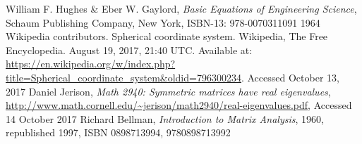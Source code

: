 \documentclass[]{article}
\begin{document}
\begin{thebibliography}{9}\label{section:biblio}
	\raggedright
	William F. Hughes \& Eber W. Gaylord,
	\emph{Basic Equations of Engineering Science},
	Schaum Publishing Company, New York,
	ISBN-13: 978-0070311091
	1964
	Wikipedia contributors. Spherical coordinate system. Wikipedia, The Free Encyclopedia. August 19, 2017, 21:40 UTC. Available at: 
	\url{https://en.wikipedia.org/w/index.php?title=Spherical_coordinate_system&oldid=796300234}.
	Accessed
	October 13, 2017
	Daniel Jerison,
	\emph{Math 2940: Symmetric matrices have real eigenvalues},
	\url{http://www.math.cornell.edu/~jerison/math2940/real-eigenvalues.pdf},
	Accessed 14 October 2017
	Richard Bellman,
	\emph{Introduction to Matrix Analysis},
	1960, republished 1997,
	ISBN	0898713994, 9780898713992
\end{thebibliography}
\end{document}
